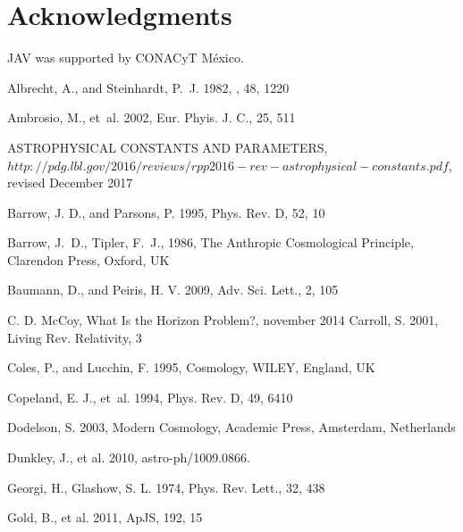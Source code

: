 \documentclass{rmaa}
\begin{document}
\section{Acknowledgments }

JAV was supported by CONACyT M\'exico.


%


\begin{thebibliography}

 Albrecht, A., and {Steinhardt,} P.~J. 1982, \prl, 48,  1220  

Ambrosio, M., et~al. 2002, Eur. Phyis. J. C., 25, 511  

 ASTROPHYSICAL CONSTANTS AND PARAMETERS,\\ \footnotesize{$http://pdg.lbl.gov/2016/reviews/rpp2016-rev-astrophysical-constants.pdf$}, revised December 2017

Barrow, J. D., and {Parsons}, P. 1995, Phys. Rev. D, 52, 10 
  
Barrow, J.~D., Tipler, F.~J., 1986, The Anthropic Cosmological Principle,
  Clarendon Press, Oxford, UK 

 Baumann, D., and  {Peiris,} H. V. 2009, Adv. Sci. Lett., 2, 105

C. D. McCoy, What Is the Horizon Problem?, november 2014
Carroll, S. 2001, Living Rev. Relativity, 3
   
Coles, P., and Lucchin, F. 1995, Cosmology, WILEY, England, UK 

  Copeland, E. J., et~al. 1994, Phys. Rev. D, 49, 6410

Dodelson, S. 2003, Modern Cosmology, Academic Press, Amsterdam, Netherlands 

  Dunkley, J.,  et al. 2010, astro-ph/1009.0866. 
 
Georgi, H., Glashow, S. L. 1974, Phys. Rev. Lett., 32, 438
 
Gold, B., et al. 2011, ApJS, 192, 15


\end{thebibliography}
\end{document}
